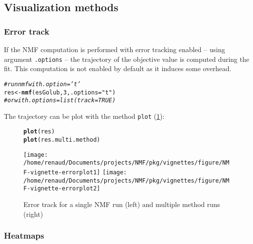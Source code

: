 \documentclass[a4paper]{article}\usepackage[]{graphicx}\usepackage[]{color}
\makeatletter
\newcommand{\hlnum}[1]{\textcolor[rgb]{0.686,0.059,0.569}{#1}}%
\newcommand{\hlstr}[1]{\textcolor[rgb]{0.192,0.494,0.8}{#1}}%
\newcommand{\hlcom}[1]{\textcolor[rgb]{0.678,0.584,0.686}{\textit{#1}}}%
\newcommand{\hlstd}[1]{\textcolor[rgb]{0.345,0.345,0.345}{#1}}%
\newcommand{\hlkwb}[1]{\textcolor[rgb]{0.69,0.353,0.396}{#1}}%
\newcommand{\hlkwc}[1]{\textcolor[rgb]{0.333,0.667,0.333}{#1}}%
\newcommand{\hlkwd}[1]{\textcolor[rgb]{0.737,0.353,0.396}{\textbf{#1}}}%
\newenvironment{kframe}{%
 \def\at@end@of@kframe{}%
 \ifinner\ifhmode%
  \def\at@end@of@kframe{\end{minipage}}%
  \begin{minipage}{\columnwidth}%
 \fi\fi%
 \def\FrameCommand##1{\hskip\@totalleftmargin \hskip-\fboxsep
 \colorbox{shadecolor}{##1}\hskip-\fboxsep
     \hskip-\linewidth \hskip-\@totalleftmargin \hskip\columnwidth}%
 \MakeFramed {\advance\hsize-\width
   \@totalleftmargin\z@ \linewidth\hsize
   \@setminipage}}%
 {\par\unskip\endMakeFramed%
 \at@end@of@kframe}
\newenvironment{knitrout}{}{} %
\let\code=\texttt
\makeatother
\begin{document}
\subsection{Visualization methods}

\subsubsection*{Error track}

If the NMF computation is performed with error tracking enabled -- using argument \code{.options} -- the trajectory of the objective value is computed during the fit.
This computation is not enabled by default as it induces some overhead. 

\begin{knitrout}
\color{fgcolor}\begin{kframe}
\begin{alltt}
\hlcom{# run nmf with .option='t'}
\hlstd{res} \hlkwb{<-} \hlkwd{nmf}\hlstd{(esGolub,} \hlnum{3}\hlstd{,} \hlkwc{.options} \hlstd{=} \hlstr{"t"}\hlstd{)}
\hlcom{# or with .options=list(track=TRUE)}
\end{alltt}
\end{kframe}
\end{knitrout}


The trajectory can be plot with the method \code{plot} (\cref{fig:errorplot}):
\begin{figure}[!htbp]
\begin{knitrout}
\color{fgcolor}\begin{kframe}
\begin{alltt}
\hlkwd{plot}\hlstd{(res)}
\hlkwd{plot}\hlstd{(res.multi.method)}
\end{alltt}
\end{kframe}
\texttt{[image: /home/renaud/Documents/projects/NMF/pkg/vignettes/figure/NMF-vignette-errorplot1]} 
\texttt{[image: /home/renaud/Documents/projects/NMF/pkg/vignettes/figure/NMF-vignette-errorplot2]} 

\end{knitrout}

\caption{Error track for a single NMF run (left) and multiple method
runs (right)}
\label{fig:errorplot}
\end{figure}

\subsubsection*{Heatmaps}
\end{document}

